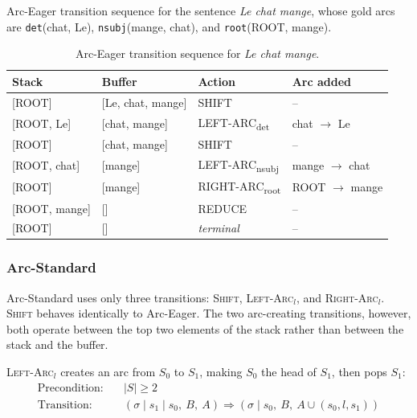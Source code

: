 \documentclass[12pt,letterpaper]{article}
\begin{document}
Arc-Eager transition sequence for the sentence \textit{Le chat mange}, 
whose gold arcs are \texttt{det}(chat, Le), \texttt{nsubj}(mange, chat), 
and \texttt{root}(ROOT, mange).
\begin{table}[ht]
\centering
\caption{Arc-Eager transition sequence for \textit{Le chat mange}.}
\label{tab:arc_eager_example}
\begin{tabular}{llll}
\hline
\textbf{Stack} & \textbf{Buffer} & \textbf{Action} & \textbf{Arc added} \\
\hline
{[ROOT]}        & [Le, chat, mange] & SHIFT                          & --                   \\
{[ROOT, Le]}    & [chat, mange]     & LEFT-ARC\textsubscript{det}    & chat $\rightarrow$ Le    \\
{[ROOT]}        & [chat, mange]     & SHIFT                          & --                   \\
{[ROOT, chat]}  & [mange]           & LEFT-ARC\textsubscript{nsubj}  & mange $\rightarrow$ chat \\
{[ROOT]}        & [mange]           & RIGHT-ARC\textsubscript{root}  & ROOT $\rightarrow$ mange \\
{[ROOT, mange]} & []                & REDUCE                         & --                   \\
{[ROOT]}        & []                & \textit{terminal}              & --                   \\
\hline
\end{tabular}
\end{table}
\FloatBarrier
\subsubsection*{Arc-Standard}

Arc-Standard \cite{nivre2003efficient} uses only three transitions: \textsc{Shift}, \textsc{Left-Arc}$_l$, and \textsc{Right-Arc}$_l$. \textsc{Shift} behaves identically to Arc-Eager. The two arc-creating transitions, however, both operate between the top two elements of the stack rather than between the stack and the buffer.

\textsc{Left-Arc}$_l$ creates an arc from $S_0$ to $S_1$, making $S_0$ the head of $S_1$, then pops $S_1$:
\begin{align}
\text{Precondition:} \quad & |S| \geq 2 \\
\text{Transition:} \quad & (\sigma \mid s_1 \mid s_0,\ B,\ A) \Longrightarrow (\sigma \mid s_0,\ B,\ A \cup {(s_0, l, s_1)})
\end{align}
\end{document}
